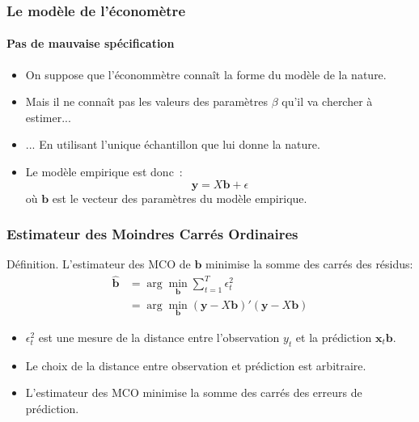\documentclass[10pt]{beamer}
\theoremstyle{plain}
\newenvironment{defn}[1]
{\bgroup \small\begin{block}{Définition. #1}}
  {\end{block}\egroup}
\begin{document}
\begin{frame}
  \frametitle{Le modèle de l'économètre}
  \framesubtitle{Pas de mauvaise spécification}

  \begin{itemize}

  \item On suppose que l'économmètre connaît la forme du modèle de la nature.\newline

    \bigskip

  \item Mais il ne connaît pas les valeurs des paramètres $\beta$ qu'il va chercher à estimer...\newline

    \bigskip

  \item ... En utilisant l'unique échantillon que lui donne la nature.\newline

    \bigskip

  \item Le modèle empirique est donc~:
    \[
      \mathbf y = X\mathbf b + \epsilon
    \]
    où $\mathbf b$ est le vecteur des paramètres du modèle empirique.
  \end{itemize}

\end{frame}


\begin{frame}
  \frametitle{Estimateur des Moindres Carrés Ordinaires}

\begin{defn}{}
  L'estimateur des MCO de $\mathbf b$ minimise la somme des carrés des résidus:
  \[
    \begin{split}
      \hat{\mathbf b} &= \arg\min_{\mathbf b} \sum_{t=1}^T \epsilon_t^2\\
      &= \arg\min_{\mathbf b} (\mathbf y-X \mathbf b)'(\mathbf y-X\mathbf b)
    \end{split}
  \]
\end{defn}

\bigskip

\begin{itemize}

\item $\epsilon_t^2$ est une mesure de la distance entre l'observation $y_t$ et la prédiction $\mathbf x_t\mathbf b$.\newline

\item Le choix de la distance entre observation et prédiction est
  arbitraire.\newline

\item L'estimateur des MCO minimise la somme des carrés des erreurs de prédiction.\newline

\end{itemize}

\end{frame}
\end{document}
